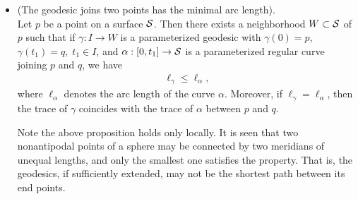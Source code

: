 \documentclass[11pt]{article}
\begin{document}
\begin{itemize}
\item \begin{proposition}\label{prop: geo_minimal_arc}
(The geodesic joins two points has the minimal arc length).\\ 
Let $p$ be a point on a surface ${\mathcal S}$. Then there exists a neighborhood $W\subset {\mathcal S}$ of $p$ such that if $\gamma: I\rightarrow W$ is  a parameterized geodesic with $\gamma(0) = p$, $\gamma(t_{1}) = q,\; t_{1}\in I$, and $\alpha: [0,t_{1}]\rightarrow {\mathcal S}$ is a parameterized regular curve joining $p$ and $q$, we have
\begin{align*}
\ell_{\gamma} \le \ell_{\alpha},
\end{align*}
where $\ell_{\alpha}$ denotes the arc length of the curve $\alpha$. Moreover, if $\ell_{\gamma} = \ell_{\alpha}$, then the trace of $\gamma$ coincides with the trace of $\alpha$ between $p$ and $q$.
\end{proposition}
Note the above proposition holds only locally. It is seen that two nonantipodal points of a sphere may be connected by two meridians of unequal lengths, and only the smallest one satisfies the property. That is, the geodesics, if sufficiently extended, may not be the shortest path between its end points. \\[15pt] 



\end{itemize}
\end{document}

